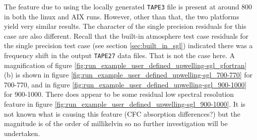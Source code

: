 The feature due to using the locally generated \texttt{TAPE3} file is present at around 800\invcm{} in both the linux and AIX runs. However, other than that, the two platforms yield very similar results. The character of the single precision residuals for this case are also different. Recall that the built-in atmosphere test case residuals for the single precision test case (see section \ref{sec:built_in_sgl}) indicated there was a frequency shift in the output \texttt{TAPE27} data files. That is not the case here. A magnification of figure \ref{fig:run_example_user_defined_upwelling-sgl_gfortran}(b) is shown in figure \ref{fig:run_example_user_defined_upwelling-sgl_700-770} for 700-770\invcm, and in figure \ref{fig:run_example_user_defined_upwelling-sgl_900-1000} for 900-1000\invcm. There does appear to be some residual low spectral resolution feature in figure \ref{fig:run_example_user_defined_upwelling-sgl_900-1000}. It is not known what is causing this feature (CFC absorption differences?) but the magnitude is of the order of millikelvin so no further investigation will be undertaken.


